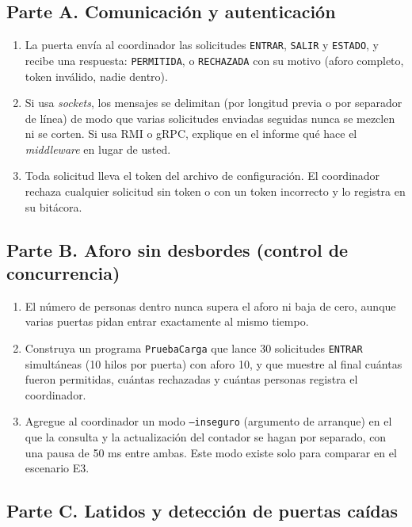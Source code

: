 \documentclass[11pt,a4paper]{article}
\begin{document}
\subsection*{Parte A. Comunicación y autenticación}

\begin{enumerate}[label=A\arabic*.]
	\item La puerta envía al coordinador las solicitudes \texttt{ENTRAR}, \texttt{SALIR} y \texttt{ESTADO}, y recibe una respuesta: \texttt{PERMITIDA}, o \texttt{RECHAZADA} con su motivo (aforo completo, token inválido, nadie dentro).
	\item Si usa \emph{sockets}, los mensajes se delimitan (por longitud previa o por separador de línea) de modo que varias solicitudes enviadas seguidas nunca se mezclen ni se corten. Si usa RMI o gRPC, explique en el informe qué hace el \emph{middleware} en lugar de usted.
	\item Toda solicitud lleva el token del archivo de configuración. El coordinador rechaza cualquier solicitud sin token o con un token incorrecto y lo registra en su bitácora.
\end{enumerate}

\subsection*{Parte B. Aforo sin desbordes (control de concurrencia)}

\begin{enumerate}[label=B\arabic*.]
	\item El número de personas dentro nunca supera el aforo ni baja de cero, aunque varias puertas pidan entrar exactamente al mismo tiempo.
	\item Construya un programa \texttt{PruebaCarga} que lance 30 solicitudes \texttt{ENTRAR} simultáneas (10 hilos por puerta) con aforo 10, y que muestre al final cuántas fueron permitidas, cuántas rechazadas y cuántas personas registra el coordinador.
	\item Agregue al coordinador un modo \texttt{--inseguro} (argumento de arranque) en el que la consulta y la actualización del contador se hagan por separado, con una pausa de 50 ms entre ambas. Este modo existe solo para comparar en el escenario E3.
\end{enumerate}

\subsection*{Parte C. Latidos y detección de puertas caídas}
\end{document}
